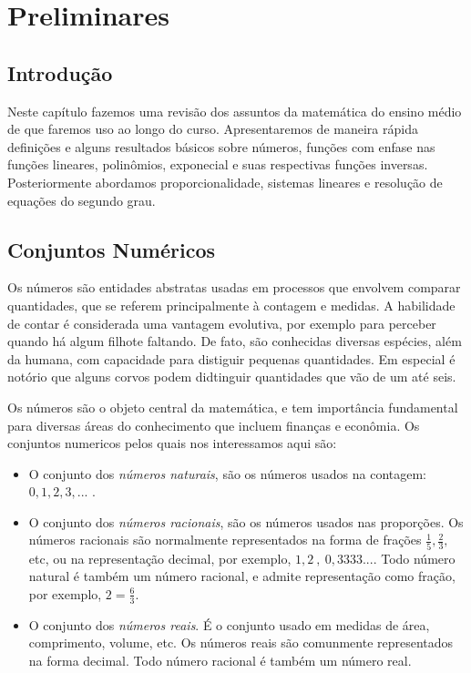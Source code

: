 \chapter{Preliminares}
\thispagestyle{empty}

\section{Introdução}


Neste capítulo fazemos uma revisão dos assuntos da matemática do ensino médio de que faremos uso ao longo do curso.
Apresentaremos de maneira rápida definições e alguns resultados básicos sobre números, funções com enfase nas funções lineares,
polinômios, exponecial e suas respectivas funções inversas. Posteriormente abordamos proporcionalidade,
 sistemas lineares e resolução de equações do segundo grau.

\section{Conjuntos Numéricos}

Os números são entidades abstratas usadas em processos que envolvem comparar quantidades, que se referem principalmente à contagem e medidas.
A habilidade de contar é considerada uma vantagem evolutiva, por exemplo para perceber quando há algum filhote faltando. De fato, são conhecidas diversas espécies,
além da humana,
com capacidade para distiguir pequenas quantidades. Em especial é notório que alguns corvos podem didtinguir quantidades que vão de um até seis.

Os números são o objeto central da matemática, e tem importância fundamental para diversas áreas do conhecimento que incluem finanças e econômia. Os conjuntos numericos pelos quais nos interessamos aqui são:
\begin{itemize}
\item[$\N$:] O conjunto dos \textit{números naturais}, são os números usados na contagem: $0,1,2,3,...$ .
\item[$\Q$:] O conjunto dos \textit{números racionais}, são os números usados nas proporções. Os números
racionais são normalmente representados na forma de frações $\frac{1}{5}, \frac{2}{3},$  etc, ou na representação
decimal, por exemplo, $1,2\ ,\ 0,3333...$. Todo número natural é também um número racional,
e admite representação como fração, por exemplo, $2=\frac{6}{3}$.
\item[$\R$:] O conjunto dos \textit{números reais}. É o conjunto usado em medidas de área,
comprimento, volume, etc. Os números reais são comunmente representados na forma decimal.
Todo número racional é também um número real.
\end{itemize}


